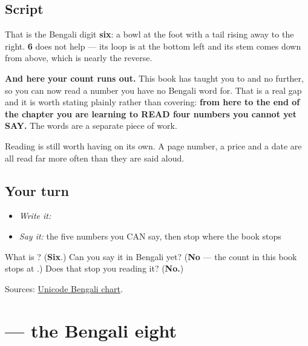 \subsection*{Script}
\begin{quote}
\end{quote}

That is the Bengali digit \textbf{six}: a bowl at the foot with a tail rising away to the right. \textbf{6} does not help — its loop is at the bottom left and its stem comes down from above, which is nearly the reverse.

\textbf{And here your count runs out.} This book has taught you \textbf{} to \textbf{} and no further, so you can now read a number you have no Bengali word for. That is a real gap and it is worth stating plainly rather than covering: \textbf{from here to the end of the chapter you are learning to READ four numbers you cannot yet SAY.} The words are a separate piece of work.

Reading is still worth having on its own. A page number, a price and a date are all read far more often than they are said aloud.

\subsection*{Your turn}
\begin{itemize}
\raggedright
  \item \emph{Write it:} 
  \item \emph{Say it:} the five numbers you CAN say, then stop where the book stops
\end{itemize}

\begin{tcolorbox}[breakable,colback=teal!4,colframe=teal!35!black,title={Before you move on}]
What is \textbf{}? (\textbf{Six}.) Can you say it in Bengali yet? (\textbf{No} — the count in this book stops at \textbf{}.) Does that stop you reading it? (\textbf{No.})

Sources: \href{https://www.unicode.org/charts/PDF/U0980.pdf}{Unicode Bengali chart}.
\end{tcolorbox}
\section[\texorpdfstring{\bn{৮} (digit eight)}{৮ (digit eight)}]{ — the Bengali eight}

\label{lesson:BN-W07-digit-eight}



